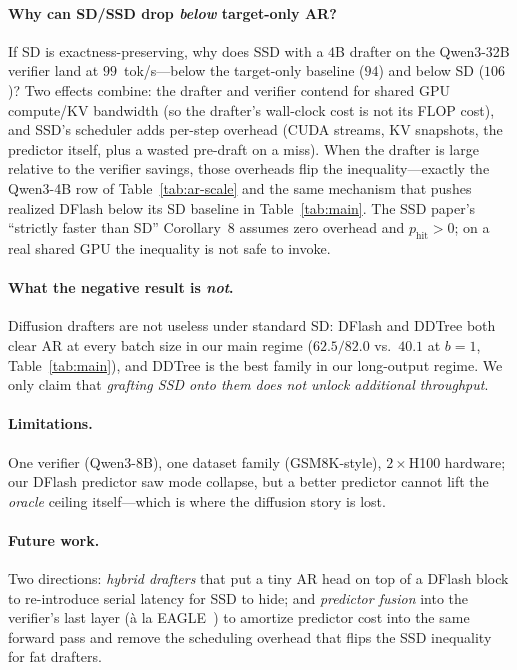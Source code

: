 \documentclass{article}
\begin{document}
\paragraph{Why can SD/SSD drop \emph{below} target-only AR?}
If SD is exactness-preserving, why does SSD with a $4$B drafter on the Qwen3-32B verifier land at $99$~tok/s---below the target-only baseline ($94$) and below SD ($106$)?
Two effects combine: the drafter and verifier contend for shared GPU compute/KV bandwidth (so the drafter's wall-clock cost is not its FLOP cost), and SSD's scheduler adds per-step overhead (CUDA streams, KV snapshots, the predictor itself, plus a wasted pre-draft on a miss).
When the drafter is large relative to the verifier savings, those overheads flip the inequality---exactly the Qwen3-4B row of Table~\ref{tab:ar-scale} and the same mechanism that pushes realized DFlash below its SD baseline in Table~\ref{tab:main}.
The SSD paper's ``strictly faster than SD'' Corollary~8 assumes zero overhead and $p_{\text{hit}}{>}0$; on a real shared GPU the inequality is not safe to invoke.

\paragraph{What the negative result is \emph{not}.}
Diffusion drafters are not useless under standard SD: DFlash and DDTree both clear AR at every batch size in our main regime ($62.5/82.0$ vs.\ $40.1$ at $b{=}1$, Table~\ref{tab:main}), and DDTree is the best family in our long-output regime.
We only claim that \emph{grafting SSD onto them does not unlock additional throughput}.

\paragraph{Limitations.}
One verifier (Qwen3-8B), one dataset family (GSM8K-style), $2{\times}$H100 hardware; our DFlash predictor saw mode collapse, but a better predictor cannot lift the \emph{oracle} ceiling itself---which is where the diffusion story is lost.

\paragraph{Future work.}
Two directions: \emph{hybrid drafters} that put a tiny AR head on top of a DFlash block to re-introduce serial latency for SSD to hide; and \emph{predictor fusion} into the verifier's last layer (à la EAGLE~\citep{li2024eagle}) to amortize predictor cost into the same forward pass and remove the scheduling overhead that flips the SSD inequality for fat drafters.
\end{document}
